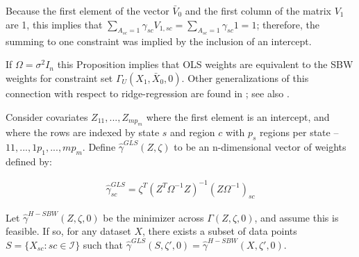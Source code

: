 \begin{remark}
    Because the first element of the vector $\bar{V}_0$ and the first column of the matrix $V_1$ are 1, this implies that $\sum_{A_{sc} = 1}\gamma_{sc}V_{1, sc} = \sum_{A_{sc} = 1}\gamma_{sc}1 = 1$; therefore, the summing to one constraint was implied by the inclusion of an intercept.
\end{remark}

\begin{remark}
    If $\Omega = \sigma^2I_n$ this Proposition implies that OLS weights are equivalent to the SBW weights for constraint set $\Gamma_U(X_1, \bar{X}_0, 0)$. Other generalizations of this connection with respect to ridge-regression are found in \cite{ben2018augmented}; see also \cite{chattopadhyay2021implied}.
\end{remark}

\begin{proposition}
Consider covariates $Z_{11}, ..., Z_{mp_m}$ where the first element is an intercept, and where the rows are indexed by state $s$ and region $c$ with $p_s$ regions per state -- $11, ..., 1p_1, ..., mp_m$. Define $\hat{\gamma}^{GLS}(Z, \zeta)$ to be an n-dimensional vector of weights defined by:

\begin{align*}
    \hat{\gamma}_{sc}^{GLS} = \zeta^T(Z^T\Omega^{-1}Z)^{-1}(Z\Omega^{-1})_{sc}
\end{align*}

Let $\hat{\gamma}^{H-SBW}(Z, \zeta, 0)$ be the minimizer across $\Gamma(Z, \zeta, 0)$, and assume this is feasible. If so, for any dataset $X$, there exists a subset of data points $S = \{X_{sc}: sc \in \mathcal{I}\}$ such that $\hat{\gamma}^{GLS}(S, \zeta', 0) = \hat{\gamma}^{H-SBW}(X, \zeta', 0)$.
\end{proposition}

